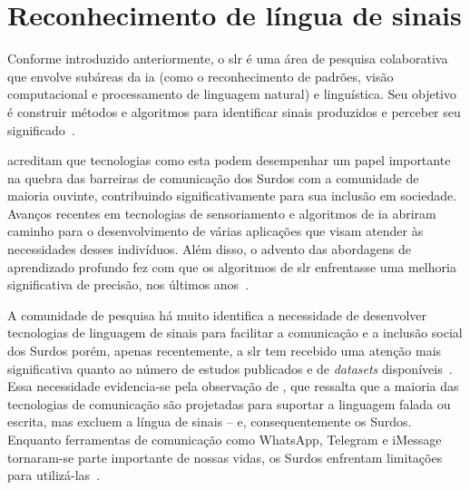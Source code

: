 \section{Reconhecimento de língua de sinais}
\label{sec:slr}

Conforme introduzido anteriormente, o \acrfull{slr} é uma área de pesquisa colaborativa que envolve subáreas da \acrfull{ia} (como o reconhecimento de padrões, visão computacional e processamento de linguagem natural) e linguística. Seu objetivo é construir métodos e algoritmos para identificar sinais produzidos e perceber seu significado~\cite{wadhawan-2019-slr-literature-review}. 

 acreditam que tecnologias como esta podem desempenhar um papel importante na quebra das barreiras de comunicação dos Surdos com a comunidade de maioria ouvinte, contribuindo significativamente para sua inclusão em sociedade. Avanços recentes em tecnologias de sensoriamento e algoritmos de \acrshort{ia} abriram caminho para o desenvolvimento de várias aplicações que visam atender às necessidades desses indivíduos. Além disso, o advento das abordagens de aprendizado profundo fez com que os algoritmos de \acrshort{slr} enfrentasse uma melhoria significativa de precisão, nos últimos anos~\cite{papastratis-2021-ai-technologies-sl,rastgoo-2021-slr-deep-survey,bragg-2019-slr-interdisciplinary}.

A comunidade de pesquisa há muito identifica a necessidade de desenvolver tecnologias de linguagem de sinais para facilitar a comunicação e a inclusão social dos Surdos porém, apenas recentemente, a \acrshort{slr} tem recebido uma atenção mais significativa quanto ao número de estudos publicados e de \textit{datasets} disponíveis~\cite{papastratis-2021-ai-technologies-sl,koller-2020-quantitative-survey-slr}.
Essa necessidade evidencia-se pela observação de , que ressalta que a maioria das tecnologias de comunicação são projetadas para suportar a linguagem falada ou escrita, mas excluem a língua de sinais -- e, consequentemente os Surdos. Enquanto ferramentas de comunicação como WhatsApp, Telegram e iMessage tornaram-se parte importante de nossas vidas, os Surdos enfrentam limitações para utilizá-las~\cite{rastgoo-2021-slr-deep-survey,bragg-2019-slr-interdisciplinary}.



